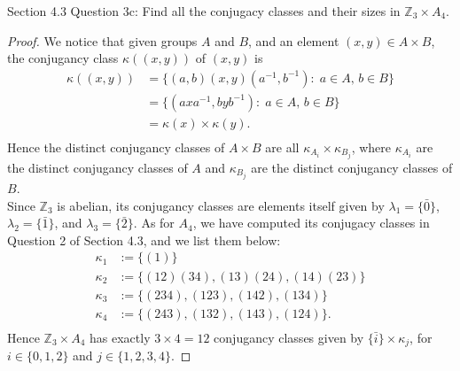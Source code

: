 Section 4.3 Question 3c:
Find all the conjugacy classes and their sizes in $\mathbb{Z}_3\times A_4$.

\begin{proof}
  We notice that given groups $A$ and $B$, and an element $(x,y)\in A\times
  B$, the conjugancy class $\kappa((x,y))$ of $(x,y)$ is
  \begin{align*}
    \kappa((x,y)) &= \{(a,b)(x,y)(a^{-1},b^{-1}):\; a\in A,\, b\in B\} \\
                  &= \{(axa^{-1},byb^{-1}):\; a\in A,\, b\in B\} \\
                  &= \kappa(x)\times \kappa(y). \\
  \end{align*}
  Hence the distinct conjugancy classes of $A\times B$ are all
  $\kappa_{A_i}\times\kappa_{B_j}$, where $\kappa_{A_i}$ are the distinct
  conjugancy classes of $A$ and $\kappa_{B_j}$ are the distinct conjugancy
  classes of $B$. \\

  Since $\mathbb{Z}_3$ is abelian, its conjugancy classes are elements
  itself given by $\lambda_1=\{\bar{0}\}$, $\lambda_2=\{\bar{1}\}$, and
  $\lambda_3=\{\bar{2}\}$. As for $A_4$, we have computed its conjugacy
  classes in Question 2 of Section 4.3, and we list them below:
  \begin{align*}
    \kappa_1 &:= \{(1)\} \\
    \kappa_2 &:= \{(12)(34),(13)(24),(14)(23)\} \\
    \kappa_3 &:= \{(234),(123),(142),(134)\} \\
    \kappa_4 &:= \{(243),(132),(143),(124)\}. \\
  \end{align*}
  Hence $\mathbb{Z}_3\times A_4$ has exactly $3\times 4=12$ conjugancy
  classes given by $\{\bar{i}\}\times\kappa_j$, for $i\in\{0,1,2\}$ and
  $j\in\{1,2,3,4\}$.
\end{proof}
